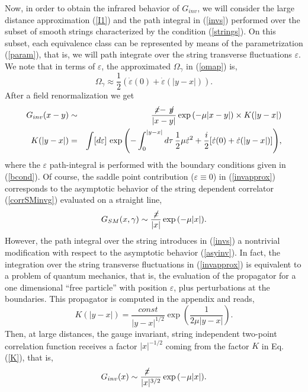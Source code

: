 \documentclass[a4paper,12pt]{article}
\begin{document}
Now, in order to obtain the infrared behavior of $G_{inv}$, we will consider the large distance approximation (\ref{I1}) and the path integral in (\ref{invs}) performed over the subset of smooth strings characterized by the condition (\ref{strings}). On this subset, each equivalence class can be represented by means of the parametrization (\ref{param}), that is, we will path integrate over the string transverse fluctuations $\varepsilon$. We note that in terms of $\varepsilon$, the 
approximated $\Omega_\gamma$ in (\ref{omap}) is, 
\begin{equation}
\Omega_\gamma \approx
\frac{1}{2}(\dot{\varepsilon}(0)+\dot{\varepsilon}(|y-x|)).
\end{equation}
After a field renormalization we get
\begin{eqnarray}
G_{inv}(x-y) &\sim &\frac{\not\! x-\not\! y}{|x-y|} \exp {(-\mu |x-y|)}\times K(|y-x|) \nonumber \\ 
K(|y-x|)&=& \int [d\varepsilon]\, \exp {\left( -\int_0^{|y-x|} d\tau\, \frac{1}{2}\mu \dot{\varepsilon}^2+ \frac{i}{2}[\dot{\varepsilon}(0)+\dot{\varepsilon}(|y-x|)]\right)},\nonumber\\
\label{invapprox}
\end{eqnarray}
where the $\varepsilon$ path-integral is performed with the boundary conditions given in (\ref{bcond}). Of course, the saddle point contribution ($\varepsilon \equiv 0$) in (\ref{invapprox}) corresponds to the asymptotic behavior of the string dependent correlator (\ref{corrSMinvg}) evaluated on a straight line,
\begin{equation}
G_{SM}(x,\gamma)\sim \frac{\not\! x}{|x|} \exp {(-\mu |x|)}.
\label{asyinv}
\end{equation}
However, the path integral over the string introduces in (\ref{invs}) a nontrivial modification with respect to the asymptotic behavior (\ref{asyinv}). In fact, the integration over the 
string transverse fluctuations in (\ref{invapprox}) is equivalent to a problem of quantum mechanics, that is, 
the evaluation of the propagator for a one dimensional ``free particle'' with position $\varepsilon$, plus perturbations at the boundaries. This propagator is computed in the appendix and reads,
\begin{equation}
K(|y-x|)=\frac{const}{|y-x|^{1/2}} \exp\left( \frac{1}{2\mu|y-x|}\right).
\label{K}
\end{equation}
Then, at large distances, the gauge invariant, string independent two-point correlation 
function receives a factor $|x|^{-1/2}$ coming from the factor $K$ in Eq.(\ref{K}), that is, 
\begin{equation}
G_{inv}(x) \sim \frac{\not\! x~~~}{|x|^{3/2}} \exp {(-\mu |x|)}.
\label{inv-asym}
\end{equation}
\end{document}

